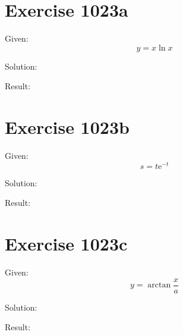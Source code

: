\documentclass[a4paper, 10pt]{scrartcl}
\newcommand*\euler{\mathrm{e}}
\begin{document}
\section{Exercise 1023a}

Given:
\[
y = x\ln{x}
\]

Solution:

Result:

\section{Exercise 1023b}

Given:
\[
s = t\euler^{-t}
\]

Solution:

Result:

\section{Exercise 1023c}

Given:
\[
y = \arctan{\frac{x}{a}}
\]

Solution:

Result:
\end{document}
